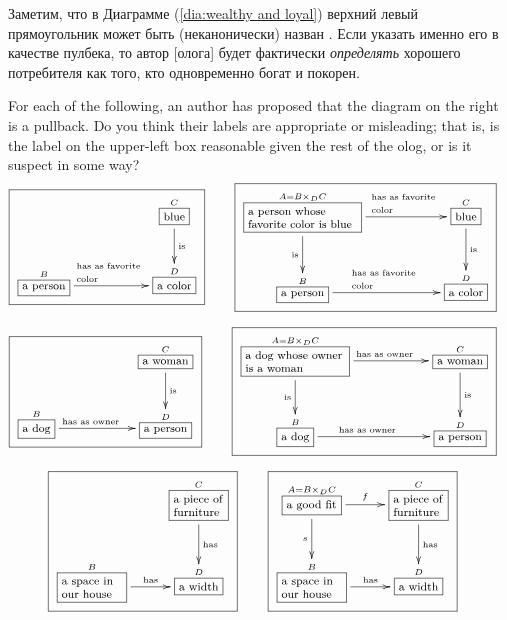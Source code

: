 \begin{remarkRUS}\label{rem:defining using pullbacks}
Заметим, что в Диаграмме (\ref{dia:wealthy and loyal}) верхний левый прямоугольник может быть (неканонически) назван . Если указать именно его в качестве пулбека, то автор [олога] будет фактически {\em определять} хорошего потребителя как того, кто одновременно богат и покорен. 
\end{remarkRUS}

\begin{exerciseENG}
For each of the following, an author has proposed that the diagram on the right is a pullback. Do you think their labels are appropriate or misleading; that is, is the label on the upper-left box reasonable given the rest of the olog, or is it suspect in some way?
\sexc\begin{align*}\footnotesize\fbox{\xymatrix{&&\smbox{C}{blue}\LA{d}{is}\\\smbox{B}{a person}\LA{rr}{\parbox{.7in}{\rr has as favorite color}}&&\smbox{D}{a color}}}\hsp&\footnotesize\fbox{\xymatrixnocompile{\obox{A=B\times_DC}{1.1in}{\rr a person whose favorite color is blue}\LAL{d}{is}\LA{rr}{\parbox{.7in}{\rr has as favorite color}}&&\smbox{C}{blue}\LA{d}{is}\\\smbox{B}{a person}\LA{rr}{\parbox{.7in}{\rr has as favorite color}}&&\smbox{D}{a color}}}
\end{align*}
\item\begin{align*}\footnotesize\fbox{\xymatrixnocompile{&&\smbox{C}{a woman}\LA{d}{is}\\\smbox{B}{a dog}\LA{rr}{\parbox{.7in}{\rr has as owner}}&&\smbox{D}{a person}}}\hsp&\footnotesize\fbox{\xymatrixnocompile{\obox{A=B\times_DC}{1in}{\rr a dog whose owner is a woman}\LAL{d}{is}\LA{rr}{\parbox{.7in}{\rr has as owner}}&&\smbox{C}{a woman}\LA{d}{is}\\\smbox{B}{a dog}\LA{rr}{\parbox{.7in}{\rr has as owner}}&&\smbox{D}{a person}}}
\end{align*}
\item\begin{align*}\footnotesize\fbox{\xymatrixnocompile{&\obox{C}{.5in}{\rr a piece of furniture}\LA{d}{has}\\\obox{B}{.6in}{\rr a space in our house}\LA{r}{has}&\smbox{D}{a width}}}\hsp&\footnotesize\fbox{\xymatrixnocompile{\obox{A=B\times_DC}{.5in}{\rr a good fit}\LAL{d}{$s$}\LA{r}{$f$}&\obox{C}{.5in}{\rr a piece of furniture}\LA{d}{has}\\\obox{B}{.6in}{\rr a space in our house}\LA{r}{has}&\smbox{D}{a width}}}
\end{align*}
\endsexc
\end{exerciseENG}

